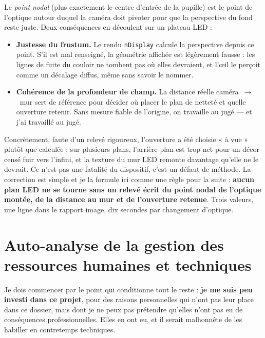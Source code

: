 \documentclass[11pt,a4paper]{report}
\begin{document}
\begin{techbox}[title={Pourquoi cela compte}]
Le \emph{point nodal} (plus exactement le centre d'entrée de la pupille) est le point de l'optique
autour duquel la caméra doit pivoter pour que la perspective du fond reste juste. Deux
conséquences en découlent sur un plateau LED :
\begin{itemize}
\item \textbf{Justesse du frustum.} Le rendu \texttt{nDisplay} calcule la perspective depuis ce
point. S'il est mal renseigné, la géométrie affichée est légèrement fausse : les lignes de fuite du
couloir ne tombent pas où elles devraient, et l'\oe il le perçoit comme un décalage diffus, même
sans savoir le nommer.
\item \textbf{Cohérence de la profondeur de champ.} La distance réelle caméra~$\rightarrow$~mur
sert de référence pour décider où placer le plan de netteté et quelle ouverture retenir. Sans
mesure fiable de l'origine, on travaille au jugé --- et j'ai travaillé au jugé.
\end{itemize}
\end{techbox}

Concrètement, faute d'un relevé rigoureux, l'ouverture a été choisie « à vue » plutôt que
calculée : sur plusieurs plans, l'arrière-plan est trop net pour un décor censé fuir vers l'infini, et
la texture du mur LED remonte davantage qu'elle ne le devrait. Ce n'est pas une fatalité du
dispositif, c'est un défaut de méthode. La correction est simple et je la formule ici comme une
règle pour la suite : \textbf{aucun plan LED ne se tourne sans un relevé écrit du point nodal de
l'optique montée, de la distance au mur et de l'ouverture retenue}. Trois valeurs, une ligne dans
le rapport image, dix secondes par changement d'optique.

\section{Auto-analyse de la gestion des ressources humaines et techniques}
Je dois commencer par le point qui conditionne tout le reste : \textbf{je me suis peu investi dans
ce projet}, pour des raisons personnelles qui n'ont pas leur place dans ce dossier, mais dont je
ne peux pas prétendre qu'elles n'ont pas eu de conséquences professionnelles. Elles en ont eu,
et il serait malhonnête de les habiller en contretemps techniques.
\end{document}
